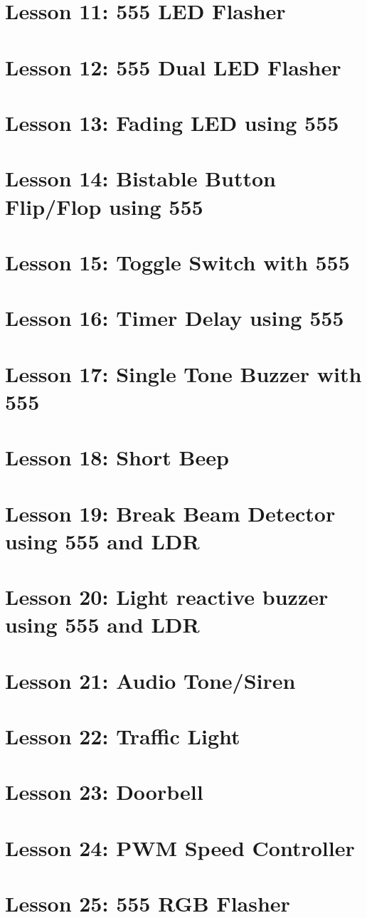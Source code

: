 \section{Lesson 11: 555 LED Flasher}
\section{Lesson 12: 555 Dual LED Flasher}
\section{Lesson 13: Fading LED using 555}
\section{Lesson 14: Bistable Button Flip/Flop using 555}
\section{Lesson 15: Toggle Switch with 555}
\section{Lesson 16: Timer Delay using 555}
\section{Lesson 17: Single Tone Buzzer with 555}
\section{Lesson 18: Short Beep}
\section{Lesson 19: Break Beam Detector using 555 and LDR}
\section{Lesson 20: Light reactive buzzer using 555 and LDR}
\section{Lesson 21: Audio Tone/Siren}
\section{Lesson 22: Traffic Light}
\section{Lesson 23: Doorbell}
\section{Lesson 24: PWM Speed Controller}
\section{Lesson 25: 555 RGB Flasher}